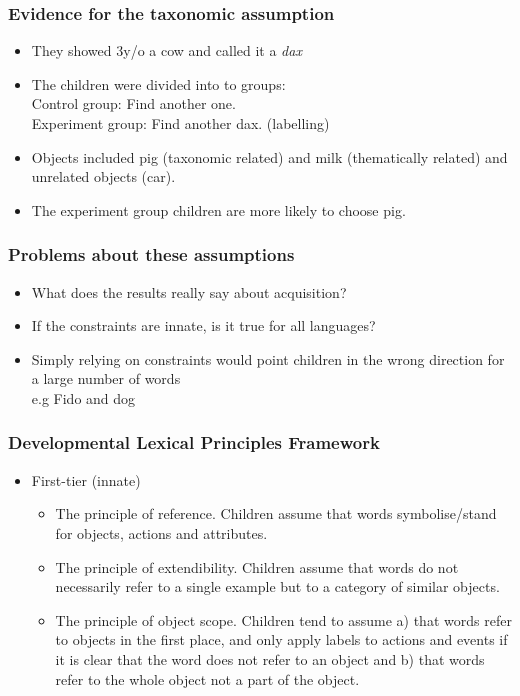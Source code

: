 \documentclass{beamer}
\begin{document}
\begin{frame}
\frametitle{Evidence for the taxonomic assumption}
\begin{itemize}
    \item They showed 3y/o a cow and called it a \textit{dax}
    \item The children were divided into to groups:
    \\ Control group: Find another one.
    \\ Experiment group: Find another dax. (labelling)
    \item Objects included pig (taxonomic related) and milk (thematically related) and unrelated objects (car).
    \item The experiment group children are more likely to choose pig.
\end{itemize}
\end{frame}
\begin{frame}
\frametitle{Problems about these assumptions}
\begin{itemize}
\item What does the results really say about acquisition?
\pause 
\item If the constraints are innate, is it true for all languages?
\item Simply relying on constraints would point children in the wrong direction for a large number of words
\\ e.g Fido and dog
\end{itemize}
\end{frame}
\begin{frame}
\frametitle{Developmental Lexical Principles Framework }
\begin{itemize}
    \item First-tier (innate)
    \begin{itemize}
        \item The principle of reference. Children assume that words symbolise/stand for objects, actions and attributes.
        \item The principle of extendibility. Children assume that words do not necessarily refer to a single example  but to a category of similar objects.
        \item The principle of object scope. Children tend to assume a) that words refer to objects in the first place, and only apply labels to actions and events if it is clear that the word does not refer to an object and b) that words refer to the whole object not a part of the object.
    \end{itemize}
\end{itemize}
\end{frame}
\end{document}
